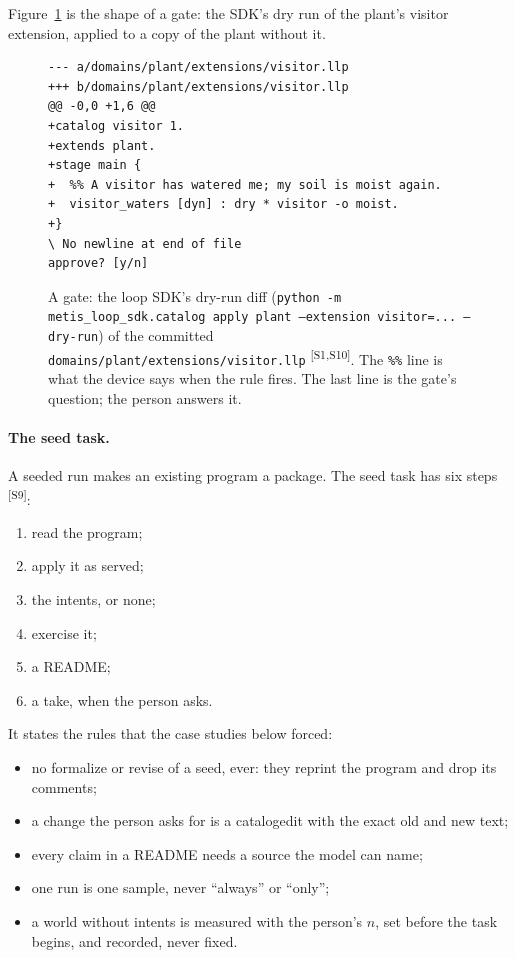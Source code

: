 \documentclass[11pt]{article}
\newcommand{\tool}[1]{{\ttfamily\begingroup\def\_{\textunderscore\allowbreak}#1\endgroup}}
\newcommand{\src}[1]{\textsuperscript{[#1]}}
\begin{document}
Figure~\ref{fig:gate} is the shape of a gate: the SDK's dry run of the
plant's visitor extension, applied to a copy of the plant without it.

\begin{figure}[t]
\begin{Verbatim}[fontsize=\small,frame=single]
--- a/domains/plant/extensions/visitor.llp
+++ b/domains/plant/extensions/visitor.llp
@@ -0,0 +1,6 @@
+catalog visitor 1.
+extends plant.
+stage main {
+  %% A visitor has watered me; my soil is moist again.
+  visitor_waters [dyn] : dry * visitor -o moist.
+}
\ No newline at end of file
approve? [y/n]
\end{Verbatim}
\caption{A gate: the loop SDK's dry-run diff
(\texttt{python -m metis\_loop\_sdk.catalog apply plant --extension
visitor=... --dry-run}) of the committed
\texttt{domains/plant/extensions/visitor.llp} \src{S1,S10}. The
\texttt{\%\%} line is what the device says when the rule fires. The last
line is the gate's question; the person answers it.}
\label{fig:gate}
\end{figure}

\paragraph{The seed task.} A seeded run makes an existing program a
package. The seed task has six steps \src{S9}:
\begin{enumerate}[nosep]
\item read the program;
\item apply it as served;
\item the intents, or none;
\item exercise it;
\item a README;
\item a take, when the person asks.
\end{enumerate}
It states the rules that the case studies below forced:
\begin{itemize}[nosep]
\item no formalize or revise of a seed, ever: they reprint the program and
  drop its comments;
\item a change the person asks for is a \tool{catalog\_edit} with the
  exact old and new text;
\item every claim in a README needs a source the model can name;
\item one run is one sample, never ``always'' or ``only'';
\item a world without intents is measured with the person's $n$, set
  before the task begins, and recorded, never fixed.
\end{itemize}
\end{document}

